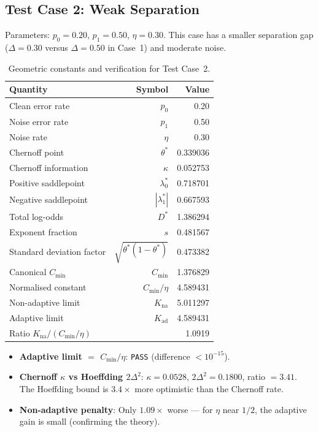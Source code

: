 \subsection{Test Case 2: Weak Separation}

Parameters: $p_0 = 0.20$, $p_1 = 0.50$, $\eta = 0.30$. This case has a smaller separation gap ($\Delta = 0.30$ versus $\Delta = 0.50$ in Case~1) and moderate noise.

\begin{table}[htbp]
\centering
\caption{Geometric constants and verification for Test Case~2.}
\label{tab:case2}
\begin{tabular}{lrr}
\toprule
Quantity & Symbol & Value \\
\midrule
Clean error rate & $p_0$ & 0.20 \\
Noise error rate & $p_1$ & 0.50 \\
Noise rate & $\eta$ & 0.30 \\
Chernoff point & $\theta^*$ & 0.339036 \\
Chernoff information & $\kappa$ & 0.052753 \\
Positive saddlepoint & $\lambda_0^*$ & 0.718701 \\
Negative saddlepoint & $|\lambda_1^*|$ & 0.667593 \\
Total log-odds & $D^*$ & 1.386294 \\
Exponent fraction & $s$ & 0.481567 \\
Standard deviation factor & $\sqrt{\theta^*(1-\theta^*)}$ & 0.473382 \\
\midrule
Canonical $C_{\min}$ & $C_{\min}$ & 1.376829 \\
Normalised constant & $C_{\min}/\eta$ & 4.589431 \\
Non-adaptive limit & $K_{\mathrm{na}}$ & 5.011297 \\
Adaptive limit & $K_{\mathrm{ad}}$ & 4.589431 \\
Ratio $K_{\mathrm{na}} / (C_{\min}/\eta)$ & & 1.0919 \\
\bottomrule
\end{tabular}
\end{table}

\begin{itemize}
    \item\textbf{Adaptive limit $=$ $C_{\min}/\eta$}: \texttt{PASS} (difference $< 10^{-15}$).
    \item\textbf{Chernoff $\kappa$ vs Hoeffding $2\Delta^2$}: $\kappa = 0.0528$, $2\Delta^2 = 0.1800$, ratio $= 3.41$. The Hoeffding bound is $3.4\times$ more optimistic than the Chernoff rate.
    \item\textbf{Non-adaptive penalty}: Only $1.09\times$ worse --- for $\eta$ near $1/2$, the adaptive gain is small (confirming the theory).
\end{itemize}

